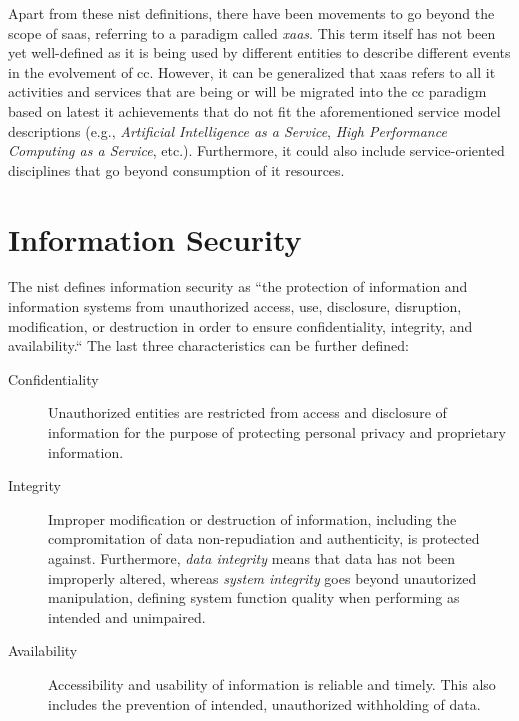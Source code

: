 		Apart from these \ac{nist} definitions, there have been movements to go beyond the scope of \ac{saas}, referring to a paradigm called \textit{\ac{xaas}}. This term itself has not been yet well-defined as it is being used by different entities to describe different events in the evolvement of \ac{cc}. \cite{Duan2015}\cite{Robison2008} However, it can be generalized that \ac{xaas} refers to all \ac{it} activities and services that are being or will be migrated into the \ac{cc} paradigm based on latest \ac{it} achievements that do not fit the aforementioned service model descriptions \cite{Duan2015} (e.g., \textit{Artificial Intelligence as a Service}, \textit{High Performance Computing as a Service}, etc.). Furthermore, it could also include service-oriented disciplines that go beyond consumption of \ac{it} resources. \cite{Doerner2011}
		
				
	\section{Information Security} \label{sec:foundations_it-security}
		
	The \ac{nist} defines information security as ``the protection of information and information systems from unauthorized access, use, disclosure, disruption, modification, or destruction in order to ensure confidentiality, integrity, and availability.`` \cite{Nieles2017} The last three characteristics can be further defined:
		
	\begin{description}
		\item[Confidentiality] Unauthorized entities are restricted from access and disclosure of information for the purpose of protecting personal privacy and proprietary information. \cite{Nieles2017}  
		\item[Integrity] Improper modification or destruction of information, including the compromitation of data non-repudiation and authenticity, is protected against. Furthermore, \textit{data integrity} means that data has not been improperly altered, whereas \textit{system integrity} goes beyond unautorized manipulation, defining system function quality when performing as intended and unimpaired. \cite{Nieles2017} 
		\item[Availability] Accessibility and usability of information is reliable and timely. \cite{Nieles2017} This also includes the prevention of intended, unauthorized withholding of data. \cite[p. 36]{FischerHuebner2001}
	\end{description}
		
